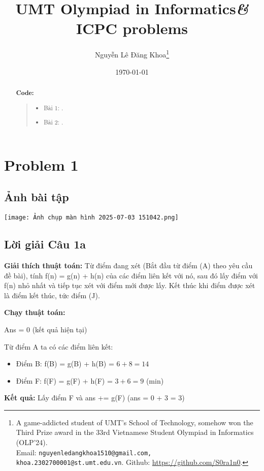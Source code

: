 \documentclass{article}
\title{UMT Olympiad in Informatics{\it\&} ICPC problems}
\author{Nguyễn Lê Đăng Khoa\footnote{A game-addicted student of UMT's School of Technology, somehow won the Third Prize award in the 33rd Vietnamese Student Olympiad in Informatics (OLP'24).\\ Email: {\tt nguyenledangkhoa1510@gmail.com, khoa.2302700001@st.umt.edu.vn}. Github: \url{https://github.com/S0ra1n0}.}}
\date{\today}
\begin{document}
\maketitle
\begin{abstract}
            
	\textbf{Code:}
	\begin{quote}
		\begin{itemize}
			\item Bài 1: \url{}.
			\item Bài 2: \url{}.\\
		\end{itemize}
	\end{quote}
\end{abstract}
\tableofcontents


\section{Problem 1}
\vspace{10pt}
\subsection{Ảnh bài tập}

\begin{center}
    \texttt{[image: Ảnh chụp màn hình 2025-07-03 151042.png]}
\end{center}

\vspace{10pt}

\subsection{Lời giải Câu 1a}

\textbf{Giải thích thuật toán: }Từ điểm đang xét (Bắt đầu từ điểm (A) theo yêu cầu đề bài), tính f(n) = g(n) + h(n) của các điểm liên kết với nó, sau đó lấy điểm với f(n) nhỏ nhất và tiếp tục xét với điểm mới được lấy. Kết thúc khi điểm được xét là điểm kết thúc, tức điểm (J).
\vspace{10pt}

\textbf{Chạy thuật toán:}
\vspace{10pt}

Ans = 0 (kết quả hiện tại)
\vspace{5pt}

Từ điểm A ta có các điểm liên kết:
\begin{itemize}
    \item Điểm B: f(B) = g(B) + h(B) = $6 + 8 = 14$
    \item Điểm F: f(F) = g(F) + h(F) = $3 + 6 = 9$ (min)
\end{itemize}
\textbf{Kết quả:} Lấy điểm F và ans += g(F) (ans = 0 + 3 = 3)
\vspace{10pt}
\end{document}
